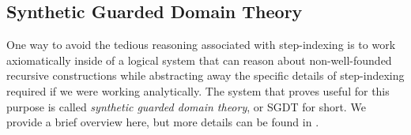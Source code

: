   \begin{comment}
  As another example, the axioms that specify the behavior of casts do not hold in the
  step-indexed setting. Consider, for example, the ``lower bound'' rule for downcasting:

  \begin{mathpar}
    \inferrule*
    {\gamlt \vdash M \ltdyn N : dyn}
    {\gamlt \vdash \dn{\dyn \ra \dyn}{\dyn} M \ltdyn N}
  \end{mathpar}

  In the language of the step-indexed logical relation used in prior work, this would
  take the form
  
  \begin{mathpar}
    \inferrule*
    {(M, N) \in \mathcal{E}^{\sim}_{i}\sem{\dyn}}
    {(\dn{\dyn \ra \dyn}{\dyn} M, N) \in \mathcal{E}^{\sim}_{i}\sem{\injarr{}}}
  \end{mathpar}

  where $\sim$ stands for $\mathrel{\preceq}$ or $\mathrel{\succeq}$, i.e.,
  counting steps on the left or right respectively.
  To show this, we would use the fact that the left-hand side steps and
  apply an anti-reduction lemma, showing that the term to which the LHS steps
  is related to the RHS where our fuel is now
  
  The left-hand side steps to a case inspection on $M$,
  where we unfold the recursive $\dyn$ type into a sum type and see whether the result
  is a function type.

  One way around these difficulties is to demand that the rules only hold
  ``extensionally'', i.e., we quantify universally over the step-index and
  reason about the ``global'' behavior of terms for all possible step indices.
  This is the approach taken in prior work.
\end{comment}


\subsection{Synthetic Guarded Domain Theory}\label{sec:sgdt}
One way to avoid the tedious reasoning associated with step-indexing is to work
axiomatically inside of a logical system that can reason about non-well-founded recursive
constructions while abstracting away the specific details of step-indexing required
if we were working analytically.
The system that proves useful for this purpose is called \emph{synthetic guarded
domain theory}, or SGDT for short. We provide a brief overview here, but more
details can be found in \cite{birkedal-mogelberg-schwinghammer-stovring2011}.

